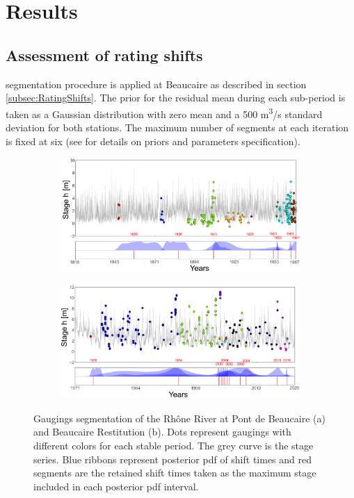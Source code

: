 \documentclass[11pt]{article}
\begin{document}
 \section{Results}
 \label{sec:Results}
 
    \subsection{Assessment of rating shifts}

    \citet{darienzo_detection_2021} segmentation procedure is applied at Beaucaire as described in section \ref{subsec:RatingShifts}. The prior for the residual mean during each sub-period is taken as a Gaussian distribution with zero mean and a 500 m\textsuperscript{3}/s standard deviation for both stations. The maximum number of segments at each iteration is fixed at six (see \citet{darienzo_detection_2021} for details on priors and parameters specification).

    \begin{figure}[h!]
        \centering
        \begin{subfigure}{0.75\textwidth}
        	\centering
        	\includegraphics[width = 1\linewidth]{Figs/6a-SegmPt.pdf}
        	\caption{}
		\end{subfigure}
		\begin{subfigure}{0.75\textwidth}
        	\centering
        	\includegraphics[width = 1\linewidth]{Figs/6b-SegmRes.pdf}
        	\caption{}
		\end{subfigure} 
		\caption{Gaugings segmentation of the Rhône River at Pont de Beaucaire (a) and Beaucaire Restitution (b). Dots represent gaugings with different colors for each stable period. The grey curve is the stage series. Blue ribbons represent posterior pdf of shift times and red segments are the retained shift times taken as the maximum stage included in each posterior pdf interval.}
        \label{fig:SegmBoth}
    \end{figure}
    
\end{document}
